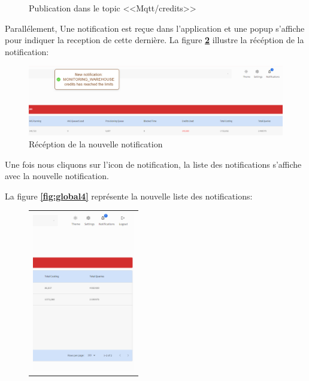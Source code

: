 \begin{itemize}
\begin{figure}[H]
        \caption{Publication dans le topic <<Mqtt/credits>>}
        \label{fig:global2}
    \end{figure}
    \par Parallélement, Une notification est reçue dans l'application et une popup s'affiche pour indiquer la reception de cette dernière. La figure \textbf{\ref{fig:global3}} illustre la récéption de la notification:
    \begin{figure}[H]
        \centering
        \includegraphics[width =1\linewidth]{img/captures/notifications/newglobal.png}
        \caption{Récéption de la nouvelle notification}
        \label{fig:global3}
    \end{figure}
    \par Une fois nous cliquons sur l'icon de notification, la liste des notifications s'affiche avec la nouvelle notification.
    \par La figure \textbf{\ref{fig:global4}} représente la nouvelle liste des notifications:
    \begin{figure}[H]
        \centering
        \begin{tabular}[b]{c}
        \includegraphics[width=0.3\linewidth ,height=7cm]{img/captures/notifications/newLimit.png} \\
        

\end{tabular}
\end{figure}
\end{itemize}
